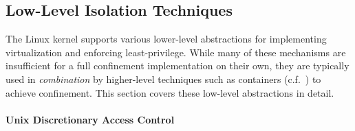 %
%

\subsection{Low-Level Isolation Techniques}
\label{subsection:low_level}

The Linux kernel supports various lower-level abstractions for implementing virtualization and enforcing least-privilege. While many of these mechanisms are insufficient for a full confinement implementation on their own, they are typically used in \textit{combination} by higher-level techniques such as containers (c.f.~) to achieve confinement. This section covers these low-level abstractions in detail.


\paragraph*{Unix Discretionary Access Control}

